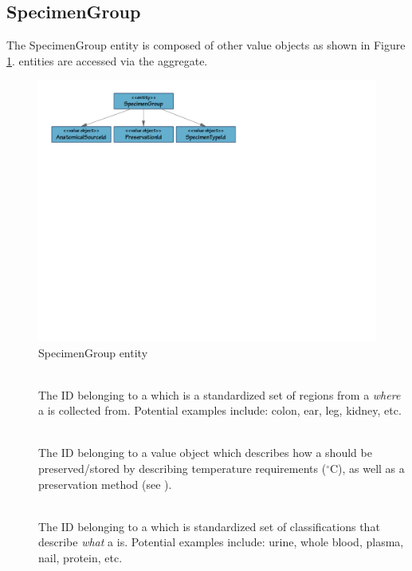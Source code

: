 \subsection{SpecimenGroup}
\label{sec:specimen-group}

The SpecimenGroup entity is composed of other value objects as shown in Figure
\ref{fig:specimen-group}.  entities are accessed
via the  aggregate.

\begin{figure}[h]
  \centering
  \includegraphics[trim={9mm 162mm 80mm 9mm}, clip,
    width=1\textwidth]{images/specimen-group}
  \caption{SpecimenGroup entity}
  \label{fig:specimen-group}
\end{figure}

\begin{description}

  \item[] \hfill \\ The ID belonging to a
     which is a standardized set of regions from a
     \emph{where} a  is collected
    from. Potential examples include: colon, ear, leg, kidney, etc.

  \item[] \hfill \\ The ID belonging to a
     value object which describes how a
     should be preserved/stored by describing temperature
    requirements ($^\circ$C), as well as a preservation method (see
    ).

  \item[] \hfill \\ The ID belonging to a
     which is standardized set of classifications that
    describe \emph{what} a  is. Potential examples
    include: urine, whole blood, plasma, nail, protein, etc.

\end{description}

